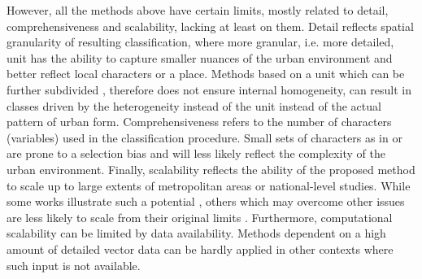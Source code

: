




However, all the methods above have certain limits, mostly related to detail, comprehensiveness and scalability, lacking at least on them. Detail reflects spatial granularity of resulting classification, where more granular, i.e. more detailed, unit has the ability to capture smaller nuances of the urban environment and better reflect local characters or a place. Methods based on a unit which can be further subdivided \citep{dibble2019origin,jochem2020,araldi2019,gil2012}, therefore does not ensure internal homogeneity, can result in classes driven by the heterogeneity instead of the unit instead of the actual pattern of urban form. Comprehensiveness refers to the number of characters (variables) used in the classification procedure. Small sets of characters as in \cite{bobkova2019} or \cite{serra2018a} are prone to a selection bias and will less likely reflect the complexity of the urban environment. Finally, scalability reflects the ability of the proposed method to scale up to large extents of metropolitan areas or national-level studies. While some works illustrate such a potential \citep{jochem2020, schirmer2015,bobkova2019,araldi2019}, others which may overcome other issues are less likely to scale from their original limits \citep{dibble2019origin}. Furthermore, computational scalability can be limited by data availability. Methods dependent on a high amount of detailed vector data \citep{bobkova2019} can be hardly applied in other contexts where such input is not available.
